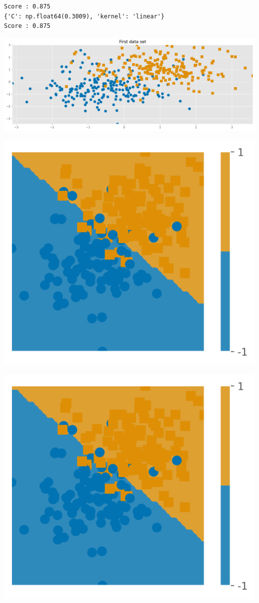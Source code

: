 \documentclass[
  12pt,
  letterpaper,
  DIV=11,
  numbers=noendperiod]{scrartcl}
\begin{document}
\begin{verbatim}
Score : 0.875
{'C': np.float64(0.3009), 'kernel': 'linear'}
Score : 0.875
\end{verbatim}

\includegraphics{Tp3_Celia_Labourail_files/figure-pdf/cell-3-output-2.png}

\includegraphics{Tp3_Celia_Labourail_files/figure-pdf/cell-3-output-3.png}

\includegraphics{Tp3_Celia_Labourail_files/figure-pdf/cell-3-output-4.png}
\end{document}
